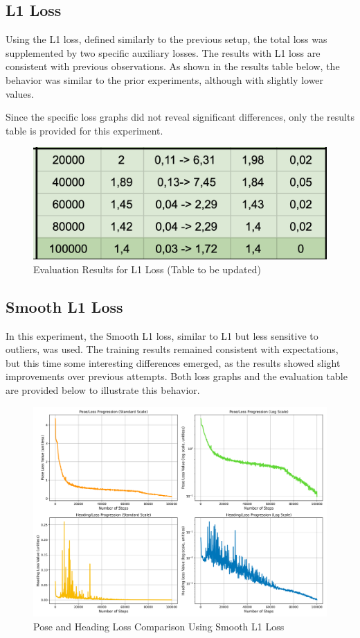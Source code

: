 \subsection*{L1 Loss}
Using the L1 loss, defined similarly to the previous setup, the total loss was supplemented by two specific auxiliary losses. The results with L1 loss are consistent with previous observations. As shown in the results table below, the behavior was similar to the prior experiments, although with slightly lower values.

Since the specific loss graphs did not reveal significant differences, only the results table is provided for this experiment.

\begin{figure}[H]
    \centering
    \includegraphics[width=0.5\linewidth]{LateX//figs/tabella_l1.png}
    \caption{Evaluation Results for L1 Loss (Table to be updated)}
    \label{fig:l1-loss-results}
\end{figure}

\subsection*{Smooth L1 Loss}
In this experiment, the Smooth L1 loss, similar to L1 but less sensitive to outliers, was used. The training results remained consistent with expectations, but this time some interesting differences emerged, as the results showed slight improvements over previous attempts. Both loss graphs and the evaluation table are provided below to illustrate this behavior.

\begin{figure}[H]
    \centering
    \includegraphics[width=0.75\linewidth]{LateX//figs/l1s_pose_heading_loss_comparison.png}
    \caption{Pose and Heading Loss Comparison Using Smooth L1 Loss}
    \label{fig:smooth-l1-pose-heading-loss}
\end{figure}


